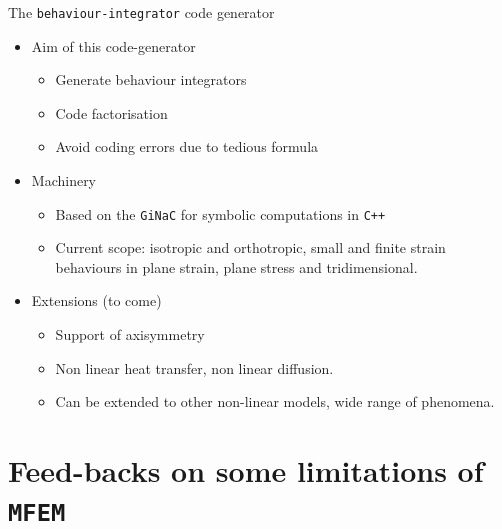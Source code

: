 \documentclass{beamer}
\providecommand{\tightlist}{%
  \setlength{\itemsep}{0pt}\setlength{\parskip}{0pt}}
\begin{document}
\begin{frame}[fragile]{The \texttt{behaviour-integrator} code generator}
\protect\hypertarget{the-behaviour-integrator-code-generator}{}
\begin{itemize}
\tightlist
\item
  Aim of this code-generator

  \begin{itemize}
  \tightlist
  \item
    Generate behaviour integrators
  \item
    Code factorisation
  \item
    Avoid coding errors due to tedious formula
  \end{itemize}
\end{itemize}

\vspace*{1mm}

\begin{itemize}
\tightlist
\item
  Machinery

  \begin{itemize}
  \tightlist
  \item
    Based on the \texttt{GiNaC} for symbolic computations in
    \texttt{C++}
  \item
    Current scope: isotropic and orthotropic, small and finite strain
    behaviours in plane strain, plane stress and tridimensional.
  \end{itemize}
\end{itemize}

\vspace*{1mm}

\begin{itemize}
\tightlist
\item
  Extensions (to come)

  \begin{itemize}
  \tightlist
  \item
    Support of axisymmetry
  \item
    Non linear heat transfer, non linear diffusion.
  \item
    Can be extended to other non-linear models, wide range of phenomena.
  \end{itemize}
\end{itemize}
\end{frame}





\section{Feed-backs on some limitations of {\tt MFEM}}
\end{document}
